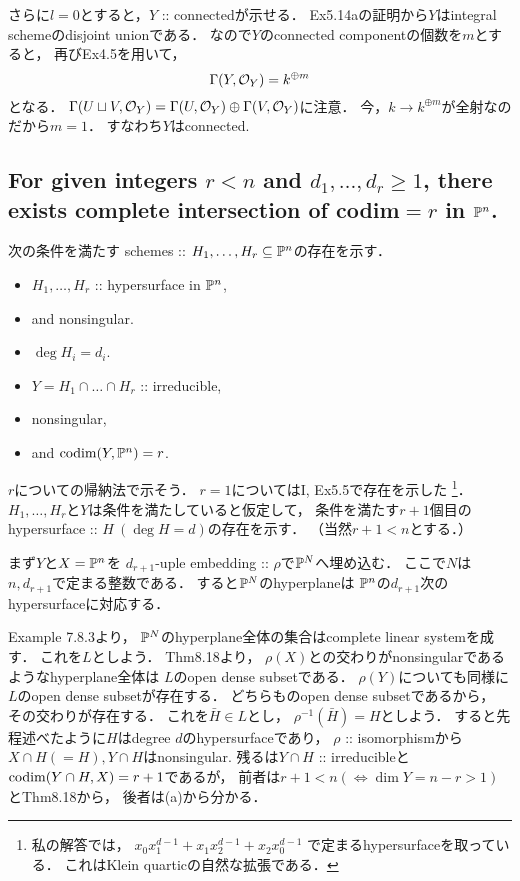 \documentclass[a4paper]{jsarticle}
\begin{document}
    さらに$l=0$とすると，$Y$ :: connectedが示せる．
    Ex5.14aの証明から$Y$はintegral schemeのdisjoint unionである．
    なので$Y$のconnected componentの個数を$m$とすると，
    再びEx4.5を用いて，
    \[ \Gamma(Y, \mathcal{O}_Y)=k^{\oplus m} \]
    となる．
    $\Gamma(U \sqcup V, \mathcal{O}_Y)=\Gamma(U, \mathcal{O}_Y) \oplus \Gamma(V, \mathcal{O}_Y)$に注意．
    今，$k \to k^{\oplus m}$が全射なのだから$m=1$．
    すなわち$Y$はconnected.

    \subsection{For given integers $r<n$ and $d_1, \dots, d_r \geq 1$,
        there exists complete intersection of codim$=r$ in $\mathbb{P}^n$.}
    次の条件を満たす schemes :: $H_1,\dots,H_r \subseteq \mathbb{P}^n$の存在を示す．
    \begin{itemize}
        \item $H_1,\dots,H_r$ :: hypersurface in $\mathbb{P}^n$,
        \item and nonsingular.
        \item $\deg H_i=d_i$.
        \item $Y=H_1 \cap \dots \cap H_r$ :: irreducible,
        \item nonsingular,
        \item and $\operatorname{codim}(Y, \mathbb{P}^n)=r$.
    \end{itemize}

    $r$についての帰納法で示そう．
    $r=1$についてはI, Ex5.5で存在を示した
    \footnote
    {
        私の解答では，
        $x_0 x_1^{d-1}+x_1 x_2^{d-1}+x_2 x_0^{d-1}$
        で定まるhypersurfaceを取っている．
        これはKlein quarticの自然な拡張である．
    }．
    $H_1,\dots,H_r$と$Y$は条件を満たしていると仮定して，
    条件を満たす$r+1$個目のhypersurface :: $H \ (\deg H=d)$の存在を示す．
    （当然$r+1<n$とする．）

    まず$Y$と$X=\mathbb{P}^n$を
    $d_{r+1}$-uple embedding :: $\rho$で$\mathbb{P}^N$へ埋め込む．
    ここで$N$は$n, d_{r+1}$で定まる整数である．
    すると$\mathbb{P}^N$のhyperplaneは
    $\mathbb{P}^n$の$d_{r+1}$次のhypersurfaceに対応する．

    Example 7.8.3より，
    $\mathbb{P}^N$のhyperplane全体の集合はcomplete linear systemを成す．
    これを$L$としよう．
    Thm8.18より，
    $\rho(X)$との交わりがnonsingularであるようなhyperplane全体は
    $L$のopen dense subsetである．
    $\rho(Y)$についても同様に$L$のopen dense subsetが存在する．
    どちらものopen dense subsetであるから，
    その交わりが存在する．
    これを$\bar{H} \in L$とし，
    $\rho^{-1}(\bar{H})=H$としよう．
    すると先程述べたように$H$はdegree $d$のhypersurfaceであり，
    $\rho$ :: isomorphismから$X \cap H(=H), Y \cap H$はnonsingular.
    残るは$Y \cap H$ :: irreducibleと$\operatorname{codim}(Y \cap H, X)=r+1$であるが，
    前者は$r+1<n (\iff \dim Y=n-r>1)$とThm8.18から，
    後者は(a)から分かる．
\end{document}
